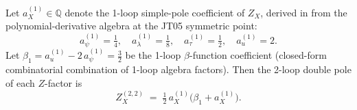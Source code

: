\documentclass[11pt,a4paper]{article}
\theoremstyle{definition}
\theoremstyle{plain}
\begin{document}
\begin{cfacbox}
Let $a_X^{(1)} \in \mathbb{Q}$ denote the 1-loop simple-pole
coefficient of $Z_X$, derived in  from the
polynomial-derivative algebra at the JT05 symmetric point:
\[
  a_\psi^{(1)} = \tfrac{1}{4},\quad
  a_\lambda^{(1)} = \tfrac{1}{8},\quad
  a_\tau^{(1)} = \tfrac{1}{2},\quad
  a_u^{(1)} = 2.
\]
Let $\beta_1 = a_u^{(1)} - 2\,a_\psi^{(1)} = \tfrac{3}{2}$ be the
1-loop $\beta$-function coefficient (closed-form combinatorial
combination of 1-loop algebra factors).  Then the 2-loop double
pole of each $Z$-factor is
\begin{equation}\label{eq:double-pole-identity}
  \boxed{\;
    Z_X^{(2,2)} \;=\; \tfrac{1}{2}\,a_X^{(1)}\bigl(\beta_1 + a_X^{(1)}\bigr).
  \;}
\end{equation}
\end{cfacbox}
\end{document}
